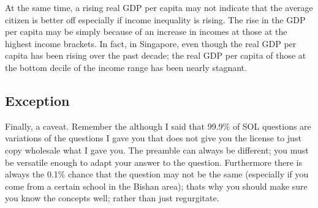 At the same time, a rising real GDP per capita may not indicate that the average citizen is better off especially if income inequality is rising. The rise in the GDP per capita may be simply because of an increase in incomes at those at the highest income brackets. In fact, in Singapore, even though the real GDP per capita has been rising over the past decade; the real GDP per capita of those at the bottom decile of the income range has been nearly stagnant.
\subsection{Exception}
Finally, a caveat. Remember the although I said that 99.9\% of SOL questions are variations of the questions I gave you that does not give you the license to just copy wholesale what I gave you. The preamble can always be different; you must be versatile enough to adapt your answer to the question. Furthermore there is always the 0.1\% chance that the question may not be the same (especially if you come from a certain school in the Bishan area); thats why you should make sure you know the concepts well; rather than just regurgitate.

